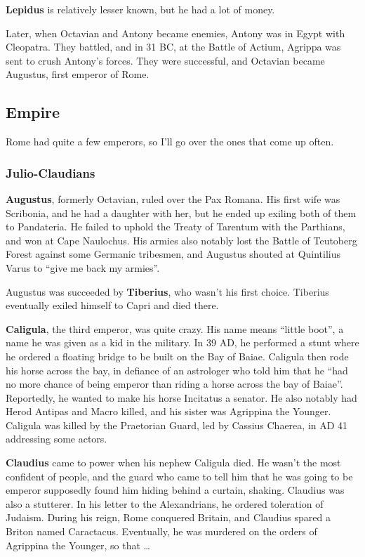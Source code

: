 \textbf{Lepidus} is relatively lesser known, but he had a lot of money.

Later, when Octavian and Antony became enemies, Antony was in Egypt with Cleopatra.
They battled, and in 31 BC, at the Battle of Actium, Agrippa was sent to crush Antony's forces.
They were successful, and Octavian became Augustus, first emperor of Rome.

\subsection*{Empire}

Rome had quite a few emperors, so I'll go over the ones that come up often.

\subsubsection*{Julio-Claudians}

\textbf{Augustus}, formerly Octavian, ruled over the Pax Romana.
His first wife was Scribonia, and he had a daughter with her,
but he ended up exiling both of them to Pandateria.
He failed to uphold the Treaty of Tarentum with the Parthians, and won at Cape Naulochus.
His armies also notably lost the Battle of Teutoberg Forest against some Germanic tribesmen,
and Augustus shouted at Quintilius Varus to ``give me back my armies''.

Augustus was succeeded by \textbf{Tiberius}, who wasn't his first choice.
Tiberius eventually exiled himself to Capri and died there.

\textbf{Caligula}, the third emperor, was quite crazy.
His name means ``little boot'', a name he was given as a kid in the military.
In 39 AD, he performed a stunt where he ordered a floating bridge to be built on the Bay of Baiae.
Caligula then rode his horse across the bay, in defiance of an astrologer who told him that he
``had no more chance of being emperor than riding a horse across the bay of Baiae''.
Reportedly, he wanted to make his horse Incitatus a senator.
He also notably had Herod Antipas and Macro killed,
and his sister was Agrippina the Younger.
Caligula was killed by the Praetorian Guard, led by Cassius Chaerea, in AD 41 addressing some actors.

\textbf{Claudius} came to power when his nephew Caligula died.
He wasn't the most confident of people, and the guard who came to tell
him that he was going to be emperor supposedly found him hiding behind a curtain, shaking.
Claudius was also a stutterer.
In his letter to the Alexandrians, he ordered toleration of Judaism.
During his reign, Rome conquered Britain, and Claudius spared a Briton named Caractacus.
Eventually, he was murdered on the orders of Agrippina the Younger, so that \ldots

